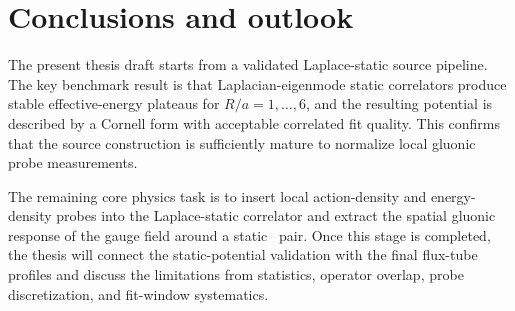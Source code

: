 \chapter{Conclusions and outlook}
\label{chap:conclusion}

The present thesis draft starts from a validated Laplace-static source pipeline. The key benchmark result is that Laplacian-eigenmode static correlators produce stable effective-energy plateaus for \(R/a=1,\ldots,6\), and the resulting potential is described by a Cornell form with acceptable correlated fit quality. This confirms that the source construction is sufficiently mature to normalize local gluonic probe measurements.

The remaining core physics task is to insert local action-density and energy-density probes into the Laplace-static correlator and extract the spatial gluonic response of the gauge field around a static \QQbar\ pair. Once this stage is completed, the thesis will connect the static-potential validation with the final flux-tube profiles and discuss the limitations from statistics, operator overlap, probe discretization, and fit-window systematics.

